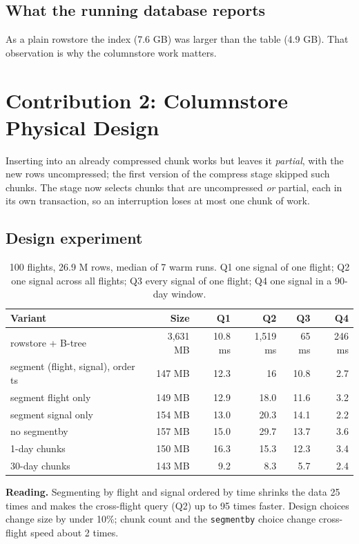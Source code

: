 \documentclass[11pt,a4paper]{article}
\newcommand{\code}[1]{\texttt{#1}}
\newcommand{\listing}[1]{}
\newcommand{\terminal}[1]{}
\begin{document}
\subsection{What the running database reports}
\terminal{term-hypertable}
\terminal{term-chunks}
\terminal{term-event}
\terminal{term-indexes}

\begin{mistake}
As a plain rowstore the index (7.6 GB) was larger than the table (4.9 GB). That observation is why the columnstore work matters.
\end{mistake}

\section{Contribution 2: Columnstore Physical Design}
\listing{code-columnstore-ddl}
\listing{code-compress}

\begin{mistake}
Inserting into an already compressed chunk works but leaves it \emph{partial}, with the new rows uncompressed; the first version of the compress stage skipped such chunks. The stage now selects chunks that are uncompressed \emph{or} partial, each in its own transaction, so an interruption loses at most one chunk of work.
\end{mistake}

\subsection{Design experiment}
\begin{table}[H]
\centering
\small
\begin{tabular}{lrrrrr}
\toprule
Variant & Size & Q1 & Q2 & Q3 & Q4\\
\midrule
rowstore + B-tree & 3,631 MB & 10.8 ms & 1,519 ms & 65 ms & 246 ms\\
segment (flight, signal), order ts & 147 MB & 12.3 & 16 & 10.8 & 2.7\\
segment flight only & 149 MB & 12.9 & 18.0 & 11.6 & 3.2\\
segment signal only & 154 MB & 13.0 & 20.3 & 14.1 & 2.2\\
no segmentby & 157 MB & 15.0 & 29.7 & 13.7 & 3.6\\
1-day chunks & 150 MB & 16.3 & 15.3 & 12.3 & 3.4\\
30-day chunks & 143 MB & 9.2 & 8.3 & 5.7 & 2.4\\
\bottomrule
\end{tabular}
\caption{100 flights, 26.9 M rows, median of 7 warm runs. Q1 one signal of one flight; Q2 one signal across all flights; Q3 every signal of one flight; Q4 one signal in a 90-day window.}
\end{table}
\textbf{Reading.} Segmenting by flight and signal ordered by time shrinks the data 25 times and makes the cross-flight query (Q2) up to 95 times faster. Design choices change size by under 10\%; chunk count and the \code{segmentby} choice change cross-flight speed about 2 times.
\end{document}
